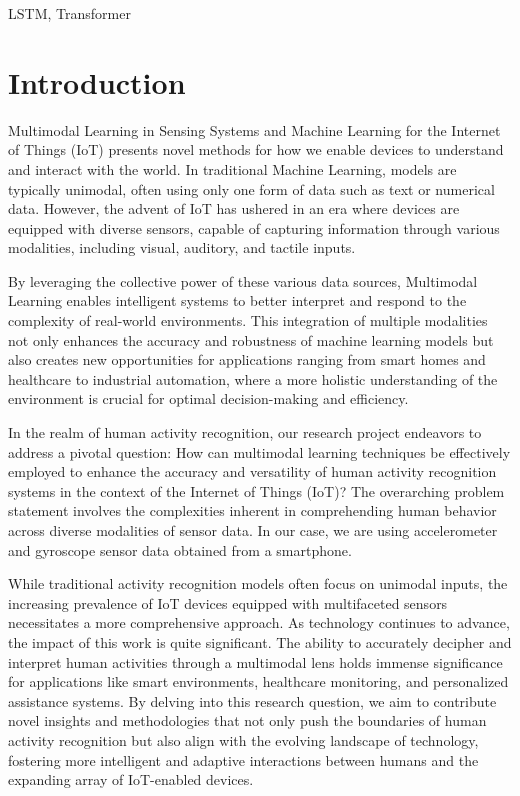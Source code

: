 \documentclass[conference]{IEEEtran}
\begin{document}
\begin{IEEEkeywords}
LSTM, Transformer
\end{IEEEkeywords}

\section{Introduction}

Multimodal Learning in Sensing Systems and Machine Learning for the Internet of Things (IoT) presents novel methods for how we enable devices to understand and interact with the world. In traditional Machine Learning, models are typically unimodal, often using only one form of data such as text or numerical data. However, the advent of IoT has ushered in an era where devices are equipped with diverse sensors, capable of capturing information through various modalities, including visual, auditory, and tactile inputs. \newline 

By leveraging the collective power of these various data sources, Multimodal Learning enables intelligent systems to better interpret and respond to the complexity of real-world environments. This integration of multiple modalities not only enhances the accuracy and robustness of machine learning models but also creates new opportunities for applications ranging from smart homes and healthcare to industrial automation, where a more holistic understanding of the environment is crucial for optimal decision-making and efficiency. \newline 

In the realm of human activity recognition, our research project endeavors to address a pivotal question: How can multimodal learning techniques be effectively employed to enhance the accuracy and versatility of human activity recognition systems in the context of the Internet of Things (IoT)? The overarching problem statement involves the complexities inherent in comprehending human behavior across diverse modalities of sensor data. In our case, we are using accelerometer and gyroscope 
sensor data obtained from a smartphone. \newline 

While traditional activity recognition models often focus on unimodal inputs, the increasing prevalence of IoT devices equipped with multifaceted sensors necessitates a more comprehensive approach. As technology continues to advance, the impact of this work is quite significant. The ability to accurately decipher and interpret human activities through a multimodal lens holds immense significance for applications like smart environments, healthcare monitoring, and personalized assistance systems. By delving into this research question, we aim to contribute novel insights and methodologies that not only push the boundaries of human activity recognition but also align with the evolving landscape of technology, fostering more intelligent and adaptive interactions between humans and the expanding array of IoT-enabled devices. \newline 
\end{document}
